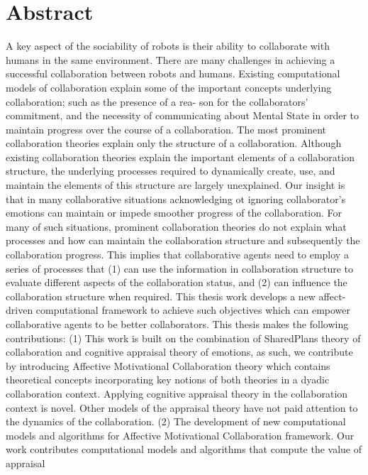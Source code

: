 \documentclass[12pt]{report}
\begin{document}

\chapter*{Abstract}
{\color{red}
A key aspect of the sociability of robots is their ability to collaborate with
humans in the same environment. There are many challenges in achieving a
successful collaboration between robots and humans. Existing computational
models of collaboration explain some of the important concepts underlying
collaboration; such as the presence of a rea- son for the collaborators’
commitment, and the necessity of communicating about Mental State in order to
maintain progress over the course of a collaboration. The most prominent
collaboration theories explain only the structure of a collaboration. Although
existing collaboration theories explain the important elements of a
collaboration structure, the underlying processes required to dynamically
create, use, and maintain the elements of this structure are largely
unexplained. Our insight is that in many collaborative situations acknowledging
ot ignoring collaborator's emotions can maintain or impede smoother progress of
the collaboration. For many of such situations, prominent collaboration theories
do not explain what processes and how can maintain the collaboration structure
and subsequently the collaboration progress. This implies that collaborative
agents need to employ a series of processes that (1) can use the information in
collaboration structure to evaluate different aspects of the collaboration
status, and (2) can influence the collaboration structure when required. This
thesis work develops a new affect-driven computational framework to achieve such
objectives which can empower collaborative agents to be better collaborators.
This thesis makes the following contributions: (1) This work is built on the
combination of SharedPlans theory of collaboration and cognitive appraisal
theory of emotions, as such, we contribute by introducing Affective
Motivational Collaboration theory which contains theoretical concepts
incorporating key notions of both theories in a dyadic collaboration context.
Applying cognitive appraisal theory in the collaboration context is novel. Other
models of the appraisal theory have not paid attention to the dynamics of the
collaboration. (2) The development of new computational models and algorithms
for Affective Motivational Collaboration framework. Our work contributes
computational models and algorithms that compute the value of appraisal
}
\end{document}
